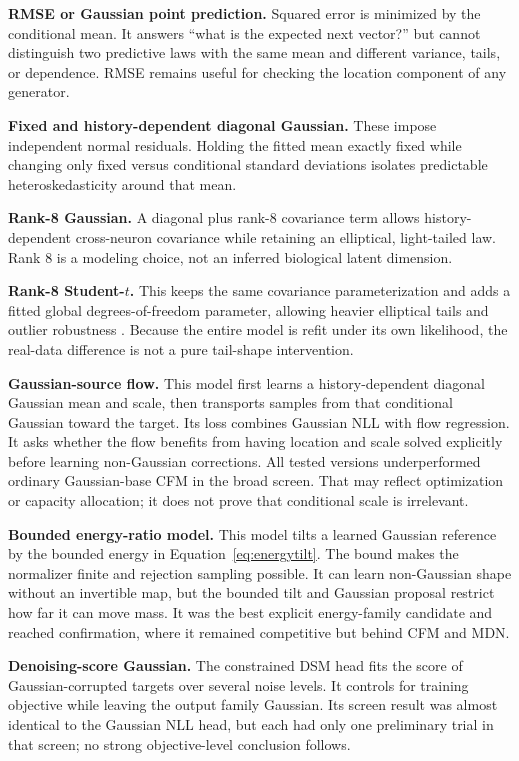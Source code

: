 \documentclass[11pt]{article}
\begin{document}
\textbf{RMSE or Gaussian point prediction.} Squared error is minimized by the conditional mean. It answers ``what is the expected next vector?'' but cannot distinguish two predictive laws with the same mean and different variance, tails, or dependence. RMSE remains useful for checking the location component of any generator.

\textbf{Fixed and history-dependent diagonal Gaussian.} These impose independent normal residuals. Holding the fitted mean exactly fixed while changing only fixed versus conditional standard deviations isolates predictable heteroskedasticity around that mean.

\textbf{Rank-8 Gaussian.} A diagonal plus rank-8 covariance term allows history-dependent cross-neuron covariance while retaining an elliptical, light-tailed law. Rank 8 is a modeling choice, not an inferred biological latent dimension.

\textbf{Rank-8 Student-$t$.} This keeps the same covariance parameterization and adds a fitted global degrees-of-freedom parameter, allowing heavier elliptical tails and outlier robustness \citep{lange1989student}. Because the entire model is refit under its own likelihood, the real-data difference is not a pure tail-shape intervention.

\textbf{Gaussian-source flow.} This model first learns a history-dependent diagonal Gaussian mean and scale, then transports samples from that conditional Gaussian toward the target. Its loss combines Gaussian NLL with flow regression. It asks whether the flow benefits from having location and scale solved explicitly before learning non-Gaussian corrections. All tested versions underperformed ordinary Gaussian-base CFM in the broad screen. That may reflect optimization or capacity allocation; it does not prove that conditional scale is irrelevant.

\textbf{Bounded energy-ratio model.} This model tilts a learned Gaussian reference by the bounded energy in Equation~\ref{eq:energytilt}. The bound makes the normalizer finite and rejection sampling possible. It can learn non-Gaussian shape without an invertible map, but the bounded tilt and Gaussian proposal restrict how far it can move mass. It was the best explicit energy-family candidate and reached confirmation, where it remained competitive but behind CFM and MDN.

\textbf{Denoising-score Gaussian.} The constrained DSM head fits the score of Gaussian-corrupted targets over several noise levels. It controls for training objective while leaving the output family Gaussian. Its screen result was almost identical to the Gaussian NLL head, but each had only one preliminary trial in that screen; no strong objective-level conclusion follows.
\end{document}
